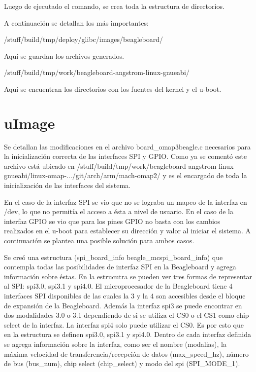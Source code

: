 \bigskip
Luego de ejecutado el comando, se crea toda la estructura de directorios.

\bigskip
A continuación se detallan los más importantes:

\bigskip
/stuff/build/tmp/deploy/glibc/images/beagleboard/ 

Aquí se guardan los archivos generados.

\bigskip
/stuff/build/tmp/work/beagleboard-angstrom-linux-gnueabi/

Aquí se encuentran los directorios con los fuentes del kernel y el u-boot.

\section{uImage}

Se detallan las modificaciones en el archivo board\_omap3beagle.c necesarios para la inicialización correcta de las interfaces SPI y GPIO. Como ya se comentó este archivo está ubicado en /stuff/build/tmp/work/beagleboard-angstrom-linux-gnueabi/linux-omap-.../git/arch/arm/mach-omap2/ y es el encargado de toda la inicialización de las interfaces del sistema.

\bigskip
En el caso de la interfaz SPI se vio que no se lograba un mapeo de la interfaz en /dev, lo que no permitía el acceso a ésta a nivel de usuario. En el caso de la interfaz GPIO se vio que para los pines GPIO no basta con los cambios realizados en el u-boot para establecer su dirección y valor al iniciar el sistema.
A continuación se plantea una posible solución para ambos casos.

\bigskip
{}

\bigskip
Se creó una estructura (spi\_board\_info beagle\_mcspi\_board\_info) que contempla todas las posibilidades de interfaz SPI en la Beagleboard y agrega información sobre éstas.
En la estrucutra se pueden ver tres formas de representar al SPI: spi3.0, spi3.1 y spi4.0. El microprocesador de la Beagleboard tiene 4 interfaces SPI disponibles de las cuales la 3 y la 4 son accesibles desde el bloque de expansión de la Beagleboard. Además la interfaz spi3 se puede encontrar en dos modalidades 3.0 o 3.1 dependiendo de si se utiliza el CS0 o el CS1 como chip select de la interfaz. La interfaz spi4 solo puede utilizar el CS0.
Es por esto que en la estructura se definen spi3.0, spi3.1 y spi4.0.
Dentro de cada interfaz definida se agrega información sobre la interfaz, como ser el nombre (modalias), la máxima velocidad de transferencia/recepción de datos (max\_speed\_hz), número de bus (bus\_num), chip select (chip\_select) y modo del spi (SPI\_MODE\_1).

